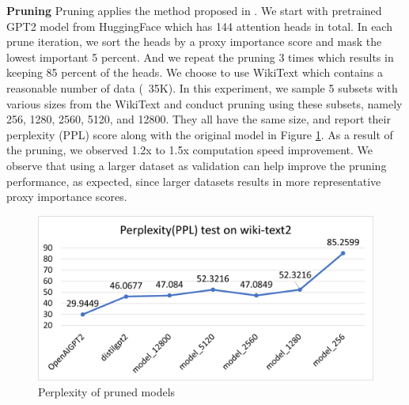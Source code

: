 \noindent \textbf{Pruning} \quad Pruning applies the method proposed in \cite{Michel2019AreSH}. We start with pretrained GPT2 model from HuggingFace which has 144 attention heads in total. In each prune iteration, we sort the heads by a proxy importance score and mask the lowest important 5 percent. And we repeat the pruning 3 times which results in keeping 85 percent of the heads. We choose to use WikiText which contains a reasonable number of data (~35K). In this experiment, we sample 5 subsets with various sizes from the WikiText and conduct pruning using these subsets, namely 256, 1280, 2560, 5120, and 12800. They all have the same size, and report their perplexity (PPL) score along with the original model in Figure \ref{fig: prune_ppl}. As a result of the pruning, we observed 1.2x to 1.5x computation speed improvement. We observe that using a larger dataset as validation can help improve the pruning performance, as expected, since larger datasets results in more representative proxy importance scores.


\begin{figure}[ht]
\includegraphics[scale = 0.48]{graphs/prune_ppl.png}
\caption{Perplexity of pruned models}
\centering
\label{fig: prune_ppl}
\end{figure}


